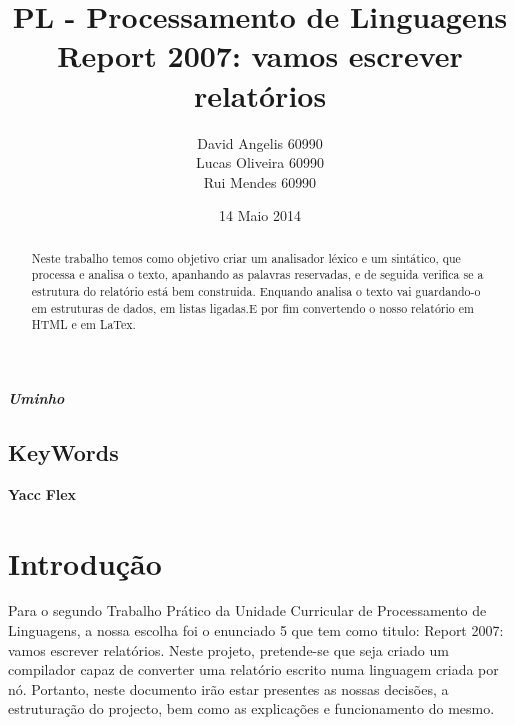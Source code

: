 \documentclass[12pt,a4paper]{report}
\begin{document}
\title{PL - Processamento de Linguagens \\ Report 2007: vamos escrever relatórios }\date{14 Maio 2014 }
\author{David Angelis   60990    \\Lucas Oliveira   60990    \\Rui Mendes   60990    \\}\maketitle\textbf{\textit{Uminho }}\section*{KeyWords}
\textbf{Yacc }
\textbf{Flex }
\begin{abstract}
Neste trabalho temos como objetivo criar um analisador léxico e um sintático, que processa e analisa o texto,
apanhando as palavras reservadas, e de seguida verifica se a estrutura do relatório está bem construida. Enquando analisa o 
texto vai guardando-o em estruturas de dados, em listas ligadas.E por fim convertendo o nosso relatório em HTML e em LaTex. 
\end{abstract}
\tableofcontents
\listoffigures
\listoftables
\chapter{Introdução }
Para o segundo Trabalho Prático da Unidade Curricular de Processamento de Linguagens, a nossa escolha foi o enunciado 5 que tem como titulo: Report 2007: vamos escrever relatórios. Neste projeto, pretende-se que seja criado um compilador capaz de 
converter
 uma relatório escrito numa linguagem criada por nó. Portanto, neste documento irão estar presentes as nossas decisões, a estruturação do projecto, bem como as explicações e funcionamento do mesmo.
\end{document}
